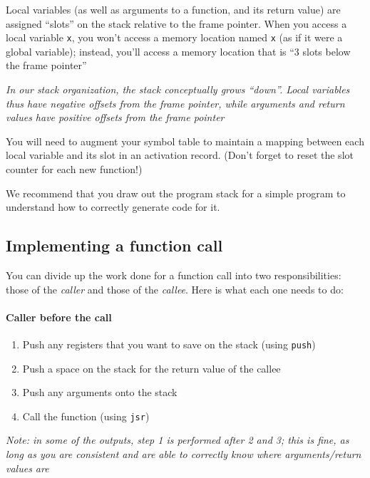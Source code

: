 \documentclass{article}
\begin{document}
Local variables (as well as arguments to a function, and its return value) are assigned ``slots'' on the stack relative to the frame pointer. When you access a local variable \texttt{x}, you won't access a memory location named \texttt{x} (as if it were a global variable); instead, you'll access a memory location that is ``3 slots below the frame pointer''

{\em In our stack organization, the stack conceptually grows ``down''. Local variables thus have negative offsets from the frame pointer, while arguments and return values have positive offsets from the frame pointer}

You will need to augment your symbol table to maintain a mapping between each local variable and its slot in an activation record. (Don't forget to reset the slot counter for each new function!)

We recommend that you draw out the program stack for a simple program to understand how to correctly generate code for it.

\subsection{Implementing a function call}
You can divide up the work done for a function call into two responsibilities: those of the {\em caller} and those of the {\em callee}. Here is what each one needs to do:

\paragraph{Caller before the call}
\begin{enumerate}
	\item Push any registers that you want to save on the stack (using \texttt{push})
	\item Push a space on the stack for the return value of the callee
	\item Push any arguments onto the stack
	\item Call the function (using \texttt{jsr})
\end{enumerate}

{\em Note: in some of the outputs, step 1 is performed after 2 and 3; this is fine, as long as you are consistent and are able to correctly know where arguments/return values are}
\end{document}
